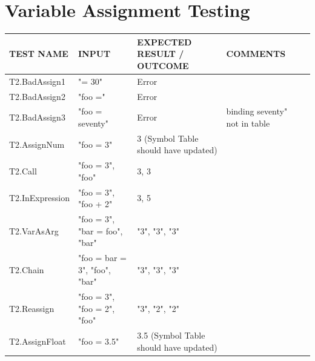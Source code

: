 \documentclass[a4paper, oneside, 11pt]{report}
\begin{document}
    \section{Variable Assignment Testing}
    \label{VarAssignTest}
    \begin{tabular}{|p{1.5in}|p{1.5in}|p{1.6in}|p{1.6in}|p{2.4in}|}
        \hline
        TEST NAME       & INPUT                     & EXPECTED RESULT / OUTCOME              & COMMENTS                                \\
        \hline
        T2.BadAssign1   & "= 30"                     & Error                                  &                                         \\
        \hline
        T2.BadAssign2   & "foo ="                   & Error                                  &                                         \\
        \hline
        T2.BadAssign3   & "foo = seventy"           & Error                                  & binding seventy" not in table           \\
        \hline
        T2.AssignNum    & "foo = 3"                 & 3 (Symbol Table should have updated)   &                                         \\
        \hline
        T2.Call         & "foo = 3", "foo"            & 3, 3                                   &                                         \\
        \hline
        T2.InExpression & "foo = 3", "foo + 2"        & 3, 5                                   &                                         \\
        \hline
        T2.VarAsArg     & "foo = 3", "bar = foo", "bar" & "3", "3", "3"                              &                                         \\
        \hline
        T2.Chain        & "foo = bar = 3", "foo", "bar" & "3", "3", "3"                              &                                         \\
        \hline
        T2.Reassign     & "foo = 3", "foo = 2", "foo"   & "3", "2", "2"                               &                                         \\
        \hline
        T2.AssignFloat  & "foo = 3.5"               & 3.5 (Symbol Table should have updated) &                                         \\
        \hline
    \end{tabular}
\end{document}
